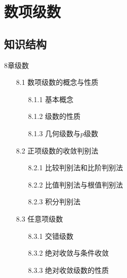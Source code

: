 \documentclass[12pt,UTF8]{ctexart}
\begin{document}
\setcounter{section}{11}
\section{数项级数}
\noindent
\subsection{知识结构}
8章级数
	\begin{enumerate}
		\item[8.1]数项级数的概念与性质
			\begin{enumerate}
				\item[8.1.1]基本概念
				\item[8.1.2]级数的性质
				\item[8.1.3]几何级数与$p$级数
			\end{enumerate}
		\item[8.2]正项级数的收敛判别法
			\begin{enumerate}
				\item[8.2.1]比较判别法和比阶判别法
				\item[8.2.2]比值判别法与根值判别法
				\item[8.2.3]积分判别法
			\end{enumerate}
		\item[8.3]任意项级数
			\begin{enumerate}
				\item[8.3.1]交错级数
				\item[8.3.2]绝对收敛与条件收敛
				\item[8.3.3]绝对收敛级数的性质
			\end{enumerate}
	\end{enumerate}
\end{document}
